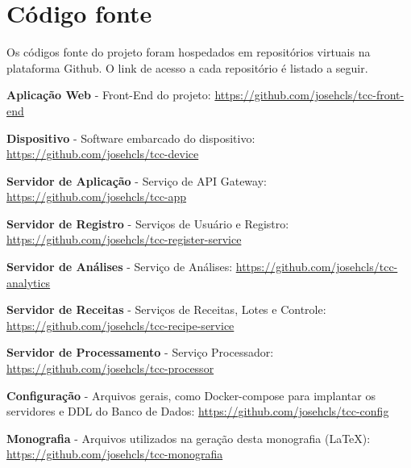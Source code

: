 \chapter{Código fonte}

Os códigos fonte do projeto foram hospedados em repositórios virtuais na plataforma Github. O link de acesso a cada repositório é listado a seguir.


\textbf{Aplicação Web} - Front-End do projeto: \url{https://github.com/josehcls/tcc-front-end}


\textbf{Dispositivo} - Software embarcado do dispositivo: \url{https://github.com/josehcls/tcc-device}


\textbf{Servidor de Aplicação} - Serviço de API Gateway: \url{https://github.com/josehcls/tcc-app}


\textbf{Servidor de Registro} - Serviços de Usuário e Registro: \url{https://github.com/josehcls/tcc-register-service}


\textbf{Servidor de Análises} - Serviço de Análises: \url{https://github.com/josehcls/tcc-analytics}


\textbf{Servidor de Receitas} - Serviços de Receitas, Lotes e Controle: \url{https://github.com/josehcls/tcc-recipe-service}


\textbf{Servidor de Processamento} - Serviço Processador: \url{https://github.com/josehcls/tcc-processor}


\textbf{Configuração} - Arquivos gerais, como Docker-compose para implantar os servidores e DDL do Banco de Dados: \url{https://github.com/josehcls/tcc-config}


\textbf{Monografia} - Arquivos utilizados na geração desta monografia (LaTeX): \url{https://github.com/josehcls/tcc-monografia}

